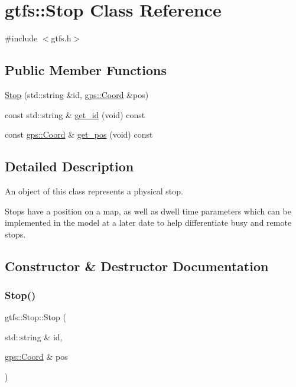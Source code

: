 \hypertarget{classgtfs_1_1Stop}{}\section{gtfs\+:\+:Stop Class Reference}
\label{classgtfs_1_1Stop}


{\ttfamily \#include $<$gtfs.\+h$>$}

\subsection*{Public Member Functions}
\begin{DoxyCompactItemize}
\item 
\hyperlink{classgtfs_1_1Stop_ac2654c54aaf615ad670c1f9c0c2fe729}{Stop} (std\+::string \&id, \hyperlink{classgps_1_1Coord}{gps\+::\+Coord} \&pos)
\item 
const std\+::string \& \hyperlink{classgtfs_1_1Stop_a95f4a615a6e06eed430a14d783557a29}{get\+\_\+id} (void) const
\item 
const \hyperlink{classgps_1_1Coord}{gps\+::\+Coord} \& \hyperlink{classgtfs_1_1Stop_acdd72b43e30c15819f16807b5c6a45d3}{get\+\_\+pos} (void) const
\end{DoxyCompactItemize}


\subsection{Detailed Description}
An object of this class represents a physical stop.

Stops have a position on a map, as well as dwell time parameters which can be implemented in the model at a later date to help differentiate busy and remote stops. 

\subsection{Constructor \& Destructor Documentation}
\mbox{\label{classgtfs_1_1Stop_ac2654c54aaf615ad670c1f9c0c2fe729}} 
\subsubsection{\texorpdfstring{Stop()}{Stop()}}
{\footnotesize\ttfamily gtfs\+::\+Stop\+::\+Stop (\begin{DoxyParamCaption}\item[{std\+::string \&}]{id,  }\item[{\hyperlink{classgps_1_1Coord}{gps\+::\+Coord} \&}]{pos }\end{DoxyParamCaption})}

